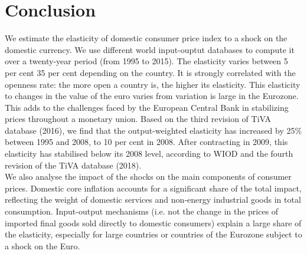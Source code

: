 \documentclass[11pt,a4paper]{article}
\begin{document}
\section{Conclusion}
\label{sec:ccl}

We estimate the elasticity of domestic consumer price index to a shock on the domestic currency.
We use different world input-ouptut databases to compute it over a twenty-year period (from 1995 to 2015).
The elasticity varies between 5 per cent 35 per cent depending on the country.
It is strongly correlated with the openness rate: the more open a country is, the higher its elasticity.
This elasticity to changes in the value of the euro varies from variation is large in the Eurozone. This adds to the challenges faced by the European Central Bank in stabilizing prices throughout a monetary union.
Based on the third revision of TiVA database (2016), we find that the output-weighted elasticity has increased by 25\% between 1995 and 2008, to 10 per cent in 2008.
After contracting in 2009, this elasticity has stabilised below its 2008 level, according to WIOD and the fourth revision of the TiVA database (2018).\\
We also analyse the impact of the shocks on the main components of consumer prices. 
Domestic core inflation accounts for a significant share of the total impact, reflecting the weight of domestic services and non-energy industrial goods in total consumption. 
Input-output mechanisms (i.e. not the change in the prices of imported final goods sold directly to domestic consumers) explain a large share of the elasticity, especially for large countries or countries of the Eurozone subject to a shock on the Euro.
\end{document}
